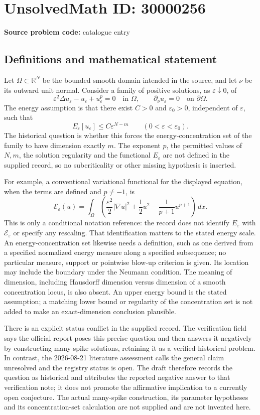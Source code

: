 \documentclass[11pt]{article}
\newcommand{\R}{\mathbb{R}}
\begin{document}
\section*{UnsolvedMath ID: 30000256}
\textbf{Source problem code:} catalogue entry
\subsection{Definitions and mathematical statement}
Let \(\Omega\subset\R^N\) be the bounded smooth domain intended in the source, and let \(\nu\) be its outward unit normal. Consider a family of positive solutions, as \(\varepsilon\downarrow0\), of
\[
 \varepsilon^2\Delta u_\varepsilon-u_\varepsilon+u_\varepsilon^p=0
 \quad\text{in }\Omega,\qquad
 \partial_\nu u_\varepsilon=0\quad\text{on }\partial\Omega.
\]
The energy assumption is that there exist \(C>0\) and \(\varepsilon_0>0\), independent of \(\varepsilon\), such that
\[
 E_\varepsilon[u_\varepsilon]\leq C\varepsilon^{N-m}
 \qquad(0<\varepsilon<\varepsilon_0).
\]
The historical question is whether this forces the energy-concentration set of the family to have dimension exactly \(m\). The exponent \(p\), the permitted values of \(N,m\), the solution regularity and the functional \(E_\varepsilon\) are not defined in the supplied record, so no subcriticality or other missing hypothesis is inserted.

For example, a conventional variational functional for the displayed equation, when the terms are defined and \(p\ne-1\), is
\[
 \mathcal E_\varepsilon(u)=\int_\Omega
 \left(\frac{\varepsilon^2}{2}|\nabla u|^2+\frac12u^2-
 \frac{1}{p+1}u^{p+1}\right)\,dx.
\]
This is only a conditional notation reference: the record does not identify \(E_\varepsilon\) with \(\mathcal E_\varepsilon\) or specify any rescaling. That identification matters to the stated energy scale. An energy-concentration set likewise needs a definition, such as one derived from a specified normalized energy measure along a specified subsequence; no particular measure, support or pointwise blow-up criterion is given. Its location may include the boundary under the Neumann condition. The meaning of dimension, including Hausdorff dimension versus dimension of a smooth concentration locus, is also absent. An upper energy bound is the stated assumption; a matching lower bound or regularity of the concentration set is not added to make an exact-dimension conclusion plausible.

There is an explicit status conflict in the supplied record. The verification field says the official report poses this precise question and then answers it negatively by constructing many-spike solutions, retaining it as a verified historical problem. In contrast, the 2026-08-21 literature assessment calls the general claim unresolved and the registry status is open. The draft therefore records the question as historical and attributes the reported negative answer to that verification note; it does not promote the affirmative implication to a currently open conjecture. The actual many-spike construction, its parameter hypotheses and its concentration-set calculation are not supplied and are not invented here.
\end{document}

